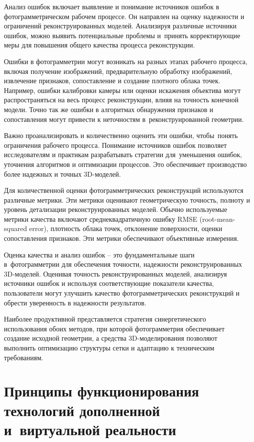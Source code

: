 \documentclass{ou}
\begin{document}
Анализ ошибок включает выявление и понимание источников ошибок в фотограмметрическом рабочем процессе. Он направлен на оценку надежности и ограничений реконструированных моделей. Анализируя различные источники ошибок, можно выявить потенциальные проблемы и~принять корректирующие меры для повышения общего качества процесса реконструкции. 

Ошибки в фотограмметрии могут возникать на разных этапах рабочего процесса, включая получение изображений, предварительную обработку изображений, извлечение признаков, сопоставление и создание плотного облака точек. Например, ошибки калибровки камеры или оценки искажения объектива могут распространяться на весь процесс реконструкции, влияя на точность конечной модели. Точно так же ошибки в алгоритмах обнаружения признаков и сопоставления могут привести к неточностям в~реконструированной геометрии. 

Важно проанализировать и количественно оценить эти ошибки, чтобы~понять ограничения рабочего процесса. Понимание источников ошибок позволяет исследователям и практикам разрабатывать стратегии для~уменьшения ошибок, уточнения алгоритмов и оптимизации процессов. Это обеспечивает производство более надежных и точных 3D-моделей.

Для количественной оценки фотограмметрических реконструкций используются различные метрики. Эти метрики оценивают геометрическую точность, полноту и уровень детализации реконструированных моделей. Обычно используемые метрики качества включают среднеквадратичную ошибку RMSE (root-mean-squared error), плотность облака точек, отклонение поверхности, оценки сопоставления признаков. Эти метрики обеспечивают объективные измерения\cite{sushentsov_2023}.

Оценка качества и анализ ошибок -- это фундаментальные шаги в~фотограмметрии для обеспечения точности, надежности реконструированных 3D-моделей. Оценивая точность реконструированных моделей, анализируя источники ошибок и используя соответствующие показатели качества, пользователи могут улучшить качество фотограмметрических реконструкций и обрести уверенность в надежности результатов.

Наиболее продуктивной представляется стратегия синергетического использования обоих методов, при которой фотограмметрия обеспечивает создание исходной геометрии, а средства 3D-моделирования позволяют выполнить оптимизацию структуры сетки и адаптацию к техническим требованиям\cite{incredibleart}.
\newpage
\section{Принципы функционирования технологий дополненной и~виртуальной реальности}
\end{document}
